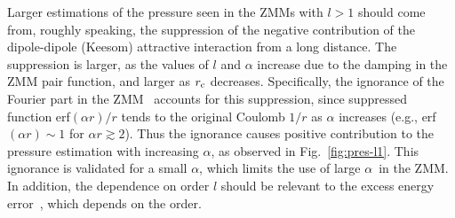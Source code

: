 \documentclass[a4paper,preprint,unsortedaddress,onecolumn,fleqn]{revtex4}
\begin{document}
{Larger estimations of the pressure seen in the ZMMs with $l>1$
should come from, roughly speaking, the suppression of the negative
contribution of the dipole-dipole (Keesom) attractive interaction from a
long distance. The suppression is larger, as the values of ${l}$ and $\alpha 
$ increase due to the damping in the ZMM pair function, and larger as $r_{%
\text{c}}$ decreases. Specifically, the ignorance of the Fourier part in the
ZMM~\cite{fukuda2011molecular} accounts for this suppression, since
suppressed function erf$(\alpha r)/r$ tends to the original Coulomb $1/r$ as 
$\alpha $ increases (e.g., erf$(\alpha r)\sim 1$ for $\alpha r\gtrsim 2$).
Thus the ignorance causes positive contribution to the pressure estimation
with increasing $\alpha $, as observed in Fig.~\ref{fig:pres-l1}. This
ignorance is validated for a small} { $\alpha $, which limits
the use of large $\alpha $\ in the ZMM. In addition, the dependence on order 
$l$ should be relevant to the excess energy error~\cite{fukuda2014zero},
which depends on the order. }
\end{document}
